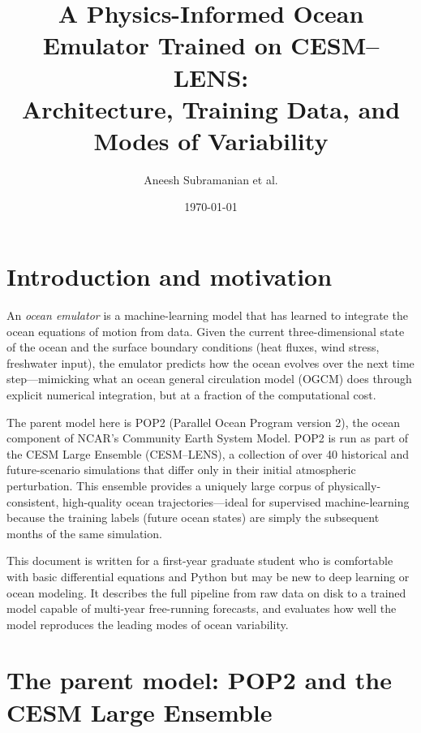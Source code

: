 \documentclass[11pt]{article}
\title{A Physics-Informed Ocean Emulator Trained on CESM--LENS:\\
       Architecture, Training Data, and Modes of Variability}
\author{Aneesh Subramanian et al.}
\date{\today}
\begin{document}
\maketitle
\tableofcontents
\newpage

\section{Introduction and motivation}
\label{sec:intro}

An \emph{ocean emulator} is a machine-learning model that has learned to
integrate the ocean equations of motion from data. Given the current
three-dimensional state of the ocean and the surface boundary conditions
(heat fluxes, wind stress, freshwater input), the emulator predicts how the
ocean evolves over the next time step---mimicking what an ocean general
circulation model (OGCM) does through explicit numerical integration, but at a
fraction of the computational cost.

The parent model here is POP2 (Parallel Ocean Program version 2), the ocean
component of NCAR's Community Earth System Model. POP2 is run as part of the
CESM Large Ensemble (CESM--LENS), a collection of over 40 historical and
future-scenario simulations that differ only in their initial atmospheric
perturbation. This ensemble provides a uniquely large corpus of
physically-consistent, high-quality ocean trajectories---ideal for supervised
machine-learning because the training labels (future ocean states) are simply
the subsequent months of the same simulation.

This document is written for a first-year graduate student who is comfortable
with basic differential equations and Python but may be new to deep learning
or ocean modeling. It describes the full pipeline from raw data on disk to a
trained model capable of multi-year free-running forecasts, and evaluates how
well the model reproduces the leading modes of ocean variability.

\section{The parent model: POP2 and the CESM Large Ensemble}
\label{sec:popmodel}
\end{document}
